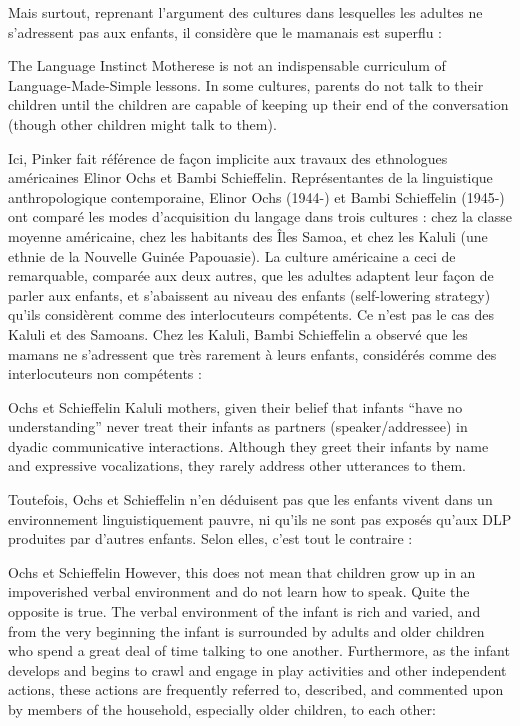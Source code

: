 Mais surtout, reprenant l'argument des cultures dans lesquelles les adultes ne s'adressent pas aux
enfants, il considère que le mamanais est superflu :
\begin{lecture}{The Language Instinct}
Motherese is not an indispensable curriculum of Language-Made-Simple lessons. In some cultures, parents do not talk to their children until the children are capable of keeping up their end of the conversation (though other children might talk to them).
\end{lecture}
Ici, Pinker fait référence de façon implicite aux travaux des ethnologues américaines Elinor Ochs
et Bambi Schieffelin.
Représentantes de la linguistique anthropologique contemporaine, Elinor Ochs (1944-) et Bambi
Schieffelin (1945-) ont comparé les modes d'acquisition du langage dans trois cultures : chez
la classe moyenne américaine, chez les habitants des Îles Samoa, et chez les Kaluli (une ethnie
de la Nouvelle Guinée Papouasie). La culture américaine a ceci de remarquable, comparée aux
deux autres, que les adultes adaptent leur façon de parler aux enfants, et s'abaissent au niveau des
enfants (self-lowering strategy) qu'ils considèrent comme des interlocuteurs compétents. Ce n'est
pas le cas des Kaluli et des Samoans.
Chez les Kaluli, Bambi Schieffelin a observé que les mamans ne s'adressent que très rarement
à leurs enfants, considérés comme des interlocuteurs non compétents :
\begin{lecture}{Ochs et Schieffelin}
Kaluli mothers, given their belief that infants “have no understanding” never treat their infants as partners (speaker/addressee) in dyadic communicative interactions. Although they greet their infants by name and expressive vocalizations, they rarely address other utterances to them.
\end{lecture}
Toutefois, Ochs et Schieffelin n'en déduisent pas que les enfants vivent dans un environnement
linguistiquement pauvre, ni qu’ils ne sont pas exposés qu'aux DLP produites par d’autres
enfants. Selon elles, c'est tout le contraire :
\begin{lecture}{Ochs et Schieffelin}
However, this does not mean that children grow up in an impoverished verbal environment and do not learn how to speak. Quite the opposite is true. The verbal environment of the infant is rich and varied, and from the very beginning the infant is surrounded by adults and older children who spend a great deal of time talking to one another. Furthermore, as the infant develops and begins to crawl and engage in play activities and other independent actions, these actions are frequently referred to, described, and commented upon by members of the household, especially older children, to each other:
\end{lecture}


